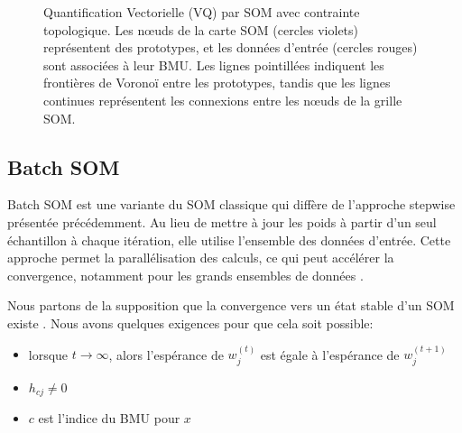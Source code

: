 \documentclass[12pt,a4paper]{report}
\begin{document}
\begin{figure}[H]
\caption{Quantification Vectorielle (VQ) par SOM avec contrainte topologique. Les nœuds de la carte SOM (cercles violets) représentent des prototypes, 
et les données d'entrée (cercles rouges) sont associées à leur BMU. Les lignes pointillées indiquent les frontières de Voronoï entre les prototypes, 
tandis que les lignes continues représentent les connexions entre les nœuds de la grille SOM.}
\label{fig:vq_som}
\end{figure}


\subsection{Batch SOM}
Batch SOM est une variante du SOM classique qui diffère de l'approche stepwise présentée précédemment. Au lieu de mettre à jour les poids à partir d'un seul échantillon à chaque itération, 
elle utilise l'ensemble des données d'entrée.
Cette approche permet la parallélisation des calculs, ce qui peut accélérer la convergence, notamment pour les grands ensembles de données \cite{Kohonen2012SOM}.

Nous partons de la supposition que la convergence vers un état stable d'un SOM existe \cite{Kohonen2012SOM}. Nous avons quelques exigences pour que cela soit possible:
\begin{itemize}
    \item lorsque $t \to \infty$, alors l'espérance de $w_j^{(t)}$ est égale à l'espérance de $w_j^{(t+1)}$
    \item $h_{cj} \neq 0$ 
    \item $c$ est l'indice du BMU pour $x$
\end{itemize} 
\end{document}
